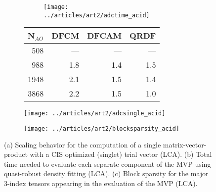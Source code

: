 \begin{figure}[htp]

\begin{subfigure}{\textwidth}
\begin{subfigure}{0.45\textwidth}
\centering
\texttt{[image: ../articles/art2/adctime\_acid]}
\end{subfigure}
\hfill
\begin{subtable}{0.45\textwidth}
\centering
\begin{tabular}{rrrr}
\hline
N$_{AO}$ & DFCM & DFCAM & QRDF \\ \hline
508 & --- & --- & --- \\ 
988 & 1.8 & 1.4 & 1.5 \\ 
1948 & 2.1 & 1.5 & 1.4 \\ 
3868 & 2.2 & 1.5 & 1.0 \\
 \hline
\end{tabular}
\end{subtable}
\caption{}
\label{fig:ES_TIME_LCA}
\end{subfigure}

\vspace{1.5\baselineskip}

\begin{subfigure}{0.45\textwidth}
\centering
\texttt{[image: ../articles/art2/adcsingle\_acid]}
\caption{}
\label{fig:ES_TIMESINGLE_LCA}
\end{subfigure}
\hfill
\begin{subfigure}{0.45\textwidth}
\centering
\texttt{[image: ../articles/art2/blocksparsity\_acid]}
\caption{}
\label{fig:ES_SPARSITY_LCA}
\end{subfigure}

\caption[Scaling behavior of CDD-DF-SOS-ADC(2) for LCA]{(a) Scaling behavior for the computation of a single matrix-vector-product with a CIS optimized (singlet) trial vector (LCA). (b) Total time needed to evaluate each separate component of the MVP using quasi-robust density fitting (LCA). (c) Block sparsity for the major 3-index tensors appearing in the evaluation of the MVP (LCA).}

\end{figure}

